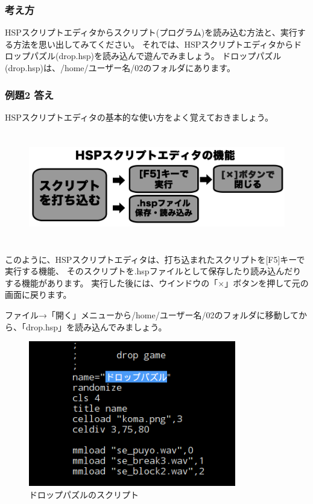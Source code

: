 \subsubsection*{考え方}

HSPスクリプトエディタからスクリプト(プログラム)を読み込む方法と、実行する方法を思い出してみてください。
それでは、HSPスクリプトエディタからドロップパズル(drop.hsp)を読み込んで遊んでみましょう。
ドロップパズル(drop.hsp)は、/home/ユーザー名/02のフォルダにあります。

\subsubsection*{例題2 答え}

HSPスクリプトエディタの基本的な使い方をよく覚えておきましょう。

\begin{figure}[H]
  \begin{center}
    \includegraphics[keepaspectratio,width=15.533cm,height=4.86cm]{images/chap02/text02-img013.png}
  \end{center}
  \label{fig:hsed_chart}
\end{figure}

\noindent
このように、HSPスクリプトエディタは、打ち込まれたスクリプトを[F5]キーで実行する機能、
そのスクリプトを.hspファイルとして保存したり読み込んだりする機能があります。
実行した後には、ウインドウの「×」ボタンを押して元の画面に戻ります。

ファイル→「開く」メニューから/home/ユーザー名/02のフォルダに移動してから、「drop.hsp」を読み込んでみましょう。

\begin{figure}[H]
  \begin{center}
    \includegraphics[keepaspectratio,width=9.049cm,height=6.346cm]{images/chap02/text02-img014.png}
    \caption{ドロップパズルのスクリプト}
  \end{center}
  \label{fig:drop_script}
\end{figure}

